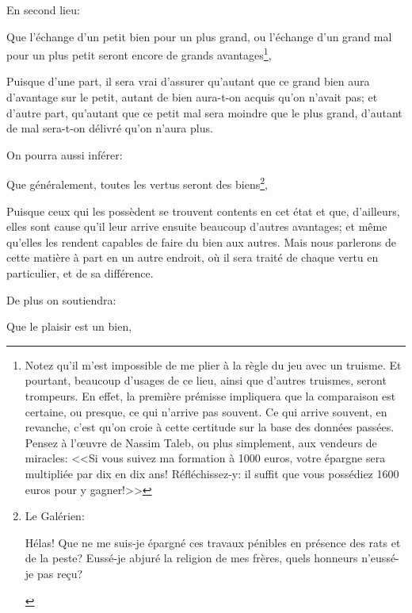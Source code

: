 \bigbreak

En second lieu:

\begin{emphpar}
     Que l'échange d'un petit bien pour un plus grand, ou l'échange d'un grand mal pour un plus petit seront encore de
	 grands avantages\footnote{Notez qu'il m'est impossible de me plier à la règle du jeu avec un truisme. Et pourtant,
	 beaucoup d'usages de ce lieu, ainsi que d'autres truismes, seront trompeurs. En effet, la première prémisse
	 impliquera que la comparaison est certaine, ou presque, ce qui n'arrive pas souvent. Ce qui arrive souvent, en
	 revanche, c'est qu'on croie à cette certitude sur la base des données passées. Pensez à l’œuvre de Nassim Taleb,
	 ou plus simplement, aux vendeurs de miracles: <<Si vous suivez ma formation à 1000 euros, votre épargne sera
     multipliée par dix en dix ans! Réfléchissez-y: il suffit que vous possédiez 1600 euros pour y gagner!>>},
\end{emphpar}

Puisque d'une part, il sera vrai d'assurer qu'autant que ce grand bien aura d'avantage sur le petit, autant de bien
aura-t-on acquis qu'on n'avait pas; et d'autre part, qu'autant que ce petit mal sera moindre que le plus grand,
d'autant de mal sera-t-on délivré qu'on n'aura plus.

\bigbreak

On pourra aussi inférer:

\begin{emphpar}
     Que généralement, toutes les vertus seront des biens\footnote{Le Galérien: \begin{emphpar}\normalfont
	 Hélas! Que ne me suis-je épargné ces travaux pénibles en présence des rats et de la peste?
	 Eussé-je abjuré la religion de mes frères, quels honneurs n'eussé-je pas reçu?\end{emphpar}},
\end{emphpar}

Puisque ceux qui les possèdent se trouvent contents en cet état et que, d'ailleurs, elles sont cause qu'il leur arrive
ensuite beaucoup d'autres avantages; et même qu'elles les rendent capables de faire du bien aux autres. Mais nous
parlerons de cette matière à part en un autre endroit, où il sera traité de chaque vertu en particulier, et de sa
différence.

\bigbreak

De plus on soutiendra:

\begin{emphpar}
     Que le plaisir est un bien,
\end{emphpar}

